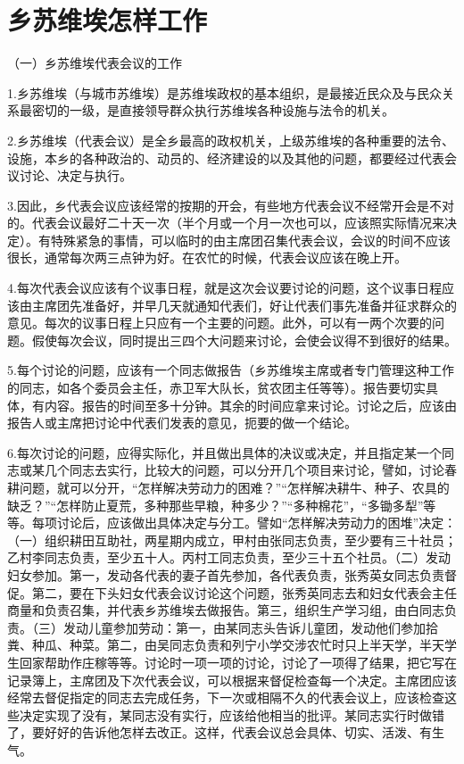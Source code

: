 \section[乡苏维埃怎样工作（一九三三年）]{乡苏维埃怎样工作}


（一）乡苏维埃代表会议的工作

1.乡苏维埃（与城市苏维埃）是苏维埃政权的基本组织，是最接近民众及与民众关系最密切的一级，是直接领导群众执行苏维埃各种设施与法令的机关。

2.乡苏维埃（代表会议）是全乡最高的政权机关，上级苏维埃的各种重要的法令、设施，本乡的各种政治的、动员的、经济建设的以及其他的问题，都要经过代表会议讨论、决定与执行。

3.因此，乡代表会议应该经常的按期的开会，有些地方代表会议不经常开会是不对的。代表会议最好二十天一次（半个月或一个月一次也可以，应该照实际情况来决定）。有特殊紧急的事情，可以临时的由主席团召集代表会议，会议的时间不应该很长，通常每次两三点钟为好。在农忙的时候，代表会议应该在晚上开。

4.每次代表会议应该有个议事日程，就是这次会议要讨论的问题，这个议事日程应该由主席团先准备好，并早几天就通知代表们，好让代表们事先准备并征求群众的意见。每次的议事日程上只应有一个主要的问题。此外，可以有一两个次要的问题。假使每次会议，同时提出三四个大问题来讨论，会使会议得不到很好的结果。

5.每个讨论的问题，应该有一个同志做报告（乡苏维埃主席或者专门管理这种工作的同志，如各个委员会主任，赤卫军大队长，贫农团主任等等）。报告要切实具体，有内容。报告的时间至多十分钟。其余的时间应拿来讨论。讨论之后，应该由报告人或主席把讨论中代表们发表的意见，扼要的做一个结论。

6.每次讨论的问题，应得实际化，并且做出具体的决议或决定，并且指定某一个同志或某几个同志去实行，比较大的问题，可以分开几个项目来讨论，譬如，讨论春耕问题，就可以分开，“怎样解决劳动力的困难？”“怎样解决耕牛、种子、农具的缺乏？”“怎样防止夏荒，多种那些早粮，种多少？”“多种棉花”，“多锄多犁”等等。每项讨论后，应该做出具体决定与分工。譬如“怎样解决劳动力的困堆”决定：（一）组织耕田互助社，两星期内成立，甲村由张同志负责，至少要有三十社员；乙村李同志负责，至少五十人。丙村工同志负责，至少三十五个社员。（二）发动妇女参加。第一，发动各代表的妻子首先参加，各代表负责，张秀英女同志负责督促。第二，要在下头妇女代表会议讨论这个问题，张秀英同志去和妇女代表会主任商量和负责召集，并代表乡苏维埃去做报告。第三，组织生产学习组，由白同志负责。（三）发动儿童参加劳动：第一，由某同志头告诉儿童团，发动他们参加拾粪、种瓜、种菜。第二，由吴同志负责和列宁小学交涉农忙时只上半天学，半天学生回家帮助作庄稼等等。讨论时一项一项的讨论，讨论了一项得了结果，把它写在记录簿上，主席团及下次代表会议，可以根据来督促检查每一个决定。主席团应该经常去督促指定的同志去完成任务，下一次或相隔不久的代表会议上，应该检查这些决定实现了没有，某同志没有实行，应该给他相当的批评。某同志实行时做错了，要好好的告诉他怎样去改正。这样，代表会议总会具体、切实、活泼、有生气。

